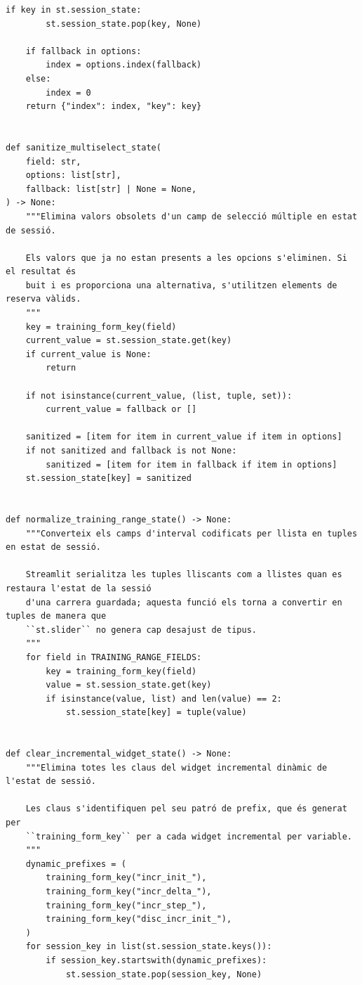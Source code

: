 \documentclass[10pt,a4paper]{article}
\begin{document}
\begin{lstlisting}[style=studioPython,caption={backend/entrenar\_agent\_session.py},label={lst:backend-entrenar-agent-session-py}]
    if key in st.session_state:
        st.session_state.pop(key, None)

    if fallback in options:
        index = options.index(fallback)
    else:
        index = 0
    return {"index": index, "key": key}


def sanitize_multiselect_state(
    field: str,
    options: list[str],
    fallback: list[str] | None = None,
) -> None:
    """Elimina valors obsolets d'un camp de selecció múltiple en estat de sessió.

    Els valors que ja no estan presents a les opcions s'eliminen. Si el resultat és
    buit i es proporciona una alternativa, s'utilitzen elements de reserva vàlids.
    """
    key = training_form_key(field)
    current_value = st.session_state.get(key)
    if current_value is None:
        return

    if not isinstance(current_value, (list, tuple, set)):
        current_value = fallback or []

    sanitized = [item for item in current_value if item in options]
    if not sanitized and fallback is not None:
        sanitized = [item for item in fallback if item in options]
    st.session_state[key] = sanitized


def normalize_training_range_state() -> None:
    """Converteix els camps d'interval codificats per llista en tuples en estat de sessió.

    Streamlit serialitza les tuples lliscants com a llistes quan es restaura l'estat de la sessió
    d'una carrera guardada; aquesta funció els torna a convertir en tuples de manera que
    ``st.slider`` no genera cap desajust de tipus.
    """
    for field in TRAINING_RANGE_FIELDS:
        key = training_form_key(field)
        value = st.session_state.get(key)
        if isinstance(value, list) and len(value) == 2:
            st.session_state[key] = tuple(value)


def clear_incremental_widget_state() -> None:
    """Elimina totes les claus del widget incremental dinàmic de l'estat de sessió.

    Les claus s'identifiquen pel seu patró de prefix, que és generat per
    ``training_form_key`` per a cada widget incremental per variable.
    """
    dynamic_prefixes = (
        training_form_key("incr_init_"),
        training_form_key("incr_delta_"),
        training_form_key("incr_step_"),
        training_form_key("disc_incr_init_"),
    )
    for session_key in list(st.session_state.keys()):
        if session_key.startswith(dynamic_prefixes):
            st.session_state.pop(session_key, None)



\end{lstlisting}
\end{document}

